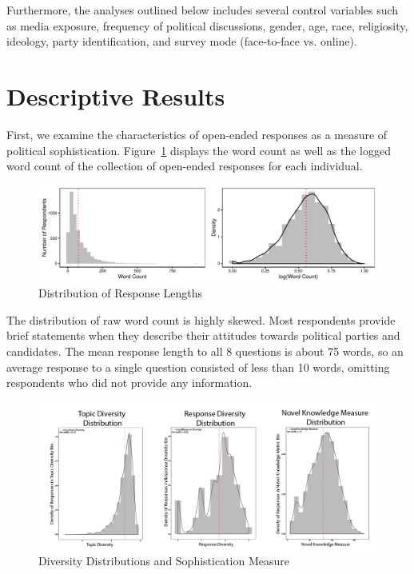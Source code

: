 \documentclass[12pt]{article}
\begin{document}
Furthermore, the analyses outlined below includes several control variables such as media exposure, frequency of political discussions, gender, age, race, religiosity, ideology, party identification, and survey mode (face-to-face vs. online).
	

\section{Descriptive Results}

First, we examine the characteristics of open-ended responses as a measure of political sophistication. Figure~\ref{fig:wc} displays the word count as well as the logged word count of the collection of open-ended responses for each individual.

\begin{figure}[h]
\includegraphics[width=\textwidth]{../fig/wc.pdf}
\caption{Distribution of Response Lengths}\label{fig:wc}
\end{figure}

The distribution of raw word count is highly skewed. Most respondents provide brief statements when they describe their attitudes towards political parties and candidates. The mean response length to all 8 questions is about 75 words, so an average response to a single question consisted of less than 10 words, omitting respondents who did not provide any information.
\begin{figure}[h]
\includegraphics[width=\textwidth]{../fig/diversity_distributions.png}
\caption{Diversity Distributions and Sophistication Measure}\label{fig:diversity}
\end{figure}
\end{document}
